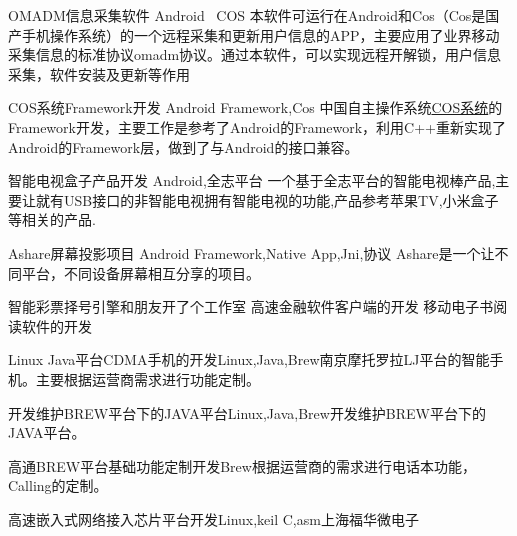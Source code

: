\documentclass[11pt,a4paper]{moderncv}
\begin{document}
\cventry{}
{OMADM信息采集软件}
{Android \, COS}
{}{}{本软件可运行在Android和Cos（Cos是国产手机操作系统）的一个远程采集和更新用户信息的APP，主要应用了业界移动采集信息的标准协议omadm协议。通过本软件，可以实现远程开解锁，用户信息采集，软件安装及更新等作用 }


\cventry{}
{COS系统Framework开发}
{Android Framework,Cos}
{}{}
{中国自主操作系统\href{http://www.china-cos.com/site/index.html}{COS系统}的Framework开发，主要工作是参考了Android的Framework，利用C++重新实现了Android的Framework层，做到了与Android的接口兼容。 }

\cventry{}
{智能电视盒子产品开发}
{Android,全志平台}
{}{}{一个基于全志平台的智能电视棒产品,主要让就有USB接口的非智能电视拥有智能电视的功能,产品参考苹果TV,小米盒子等相关的产品. }

\cventry{}
{Ashare屏幕投影项目}
{Android Framework,Native App,Jni,协议}
{}{}
{Ashare是一个让不同平台，不同设备屏幕相互分享的项目。      }


{智能彩票择号引擎}{}{和朋友开了个工作室}{}{}
\cventry{}
{高速金融软件客户端的开发}{}{}{}{}
\cventry{}
{ 移动电子书阅读软件的开发}{}{}{}{}


{Linux Java平台CDMA手机的开发}{Linux,Java,Brew}{南京摩托罗拉}{}{LJ平台的智能手机。主要根据运营商需求进行功能定制。
}

\cventry{}
{开发维护BREW平台下的JAVA平台}{Linux,Java,Brew}{}{}{开发维护BREW平台下的JAVA平台。
}

\cventry{}
{高通BREW平台基础功能定制开发}{Brew}{}{}{根据运营商的需求进行电话本功能，Calling的定制。
}

{高速嵌入式网络接入芯片平台开发}{Linux,keil C,asm}{上海福华微电子}{}{
}
\end{document}
